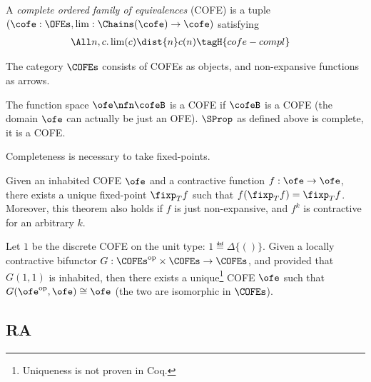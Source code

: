 \begin{defn}
  A \emph{complete ordered family of equivalences} (COFE) is a tuple $(\cofe : \OFEs,  \lim : \Chains(\cofe) \to \cofe)$ satisfying
  \begin{align*}
    \All n, c.& \lim(c) \dist{n} c(n) \tagH{cofe-compl}
  \end{align*}
\end{defn}

\begin{defn}
  The category $\COFEs$ consists of COFEs as objects, and non-expansive functions as arrows.
\end{defn}

The function space $\ofe \nfn \cofeB$ is a COFE if $\cofeB$ is a COFE (\ie the domain $\ofe$ can actually be just an OFE).
$\SProp$ as defined above is complete, \ie it is a COFE.

Completeness is necessary to take fixed-points.

\begin{thm}
\label{thm:banach}
Given an inhabited COFE $\ofe$ and a contractive function $f : \ofe \to \ofe$, there exists a unique fixed-point $\fixp_T f$ such that $f(\fixp_T f) = \fixp_T f$.
Moreover, this theorem also holds if $f$ is just non-expansive, and $f^k$ is contractive for an arbitrary $k$.
\end{thm}

\begin{thm}
\label{thm:america_rutten}
Let $1$ be the discrete COFE on the unit type: $1 \eqdef \Delta \{ () \}$.
Given a locally contractive bifunctor $G : \COFEs^{\textrm{op}} \times \COFEs \to \COFEs$, and provided that \(G(1, 1)\) is inhabited,
then there exists a unique\footnote{Uniqueness is not proven in Coq.} COFE $\ofe$ such that $G(\ofe^{\textrm{op}}, \ofe) \cong \ofe$ (\ie the two are isomorphic in $\COFEs$).
\end{thm}

\subsection{RA}

